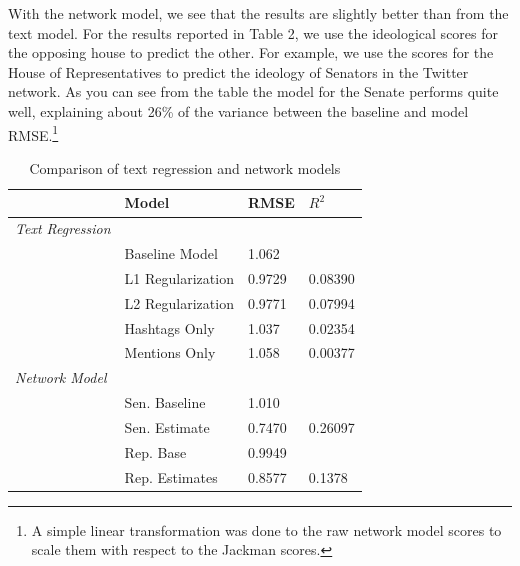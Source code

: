 \documentclass[10pt]{article}
\begin{document}
With the network model, we see that the results are slightly better than from the text model.  For the results reported in Table 2, we use the ideological scores for the opposing house to predict the other.  For example, we use the scores for the House of Representatives to predict the ideology of Senators in the Twitter network.  As you can see from the table the model for the Senate performs quite well, explaining about 26\% of the variance between the baseline and model RMSE.\footnote{A simple linear transformation was done to the raw network model scores to scale them with respect to the Jackman scores.}

\begin{table}
    \centering
    \caption{Comparison of text regression and network models}
    \begin{tabular}{llll}
        \hline
        & Model & RMSE & $R^{2}$ \\ \hline
        \emph{Text Regression} & & & \\
        & Baseline Model & 1.062 & \\
        & L1 Regularization & 0.9729 & 0.08390 \\
        & L2 Regularization & 0.9771 & 0.07994 \\
        & Hashtags Only & 1.037 & 0.02354 \\
        & Mentions Only & 1.058 & 0.00377 \\ \hline
        \emph{Network Model} & & & \\
        & Sen. Baseline & 1.010 & \\
        & Sen. Estimate & 0.7470 & 0.26097 \\
        & Rep. Base & 0.9949 & \\
        & Rep. Estimates & 0.8577 & 0.1378 \\ \hline
    \end{tabular}
\end{table}
\end{document}
